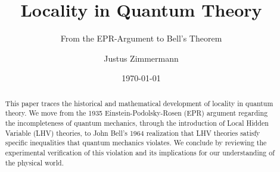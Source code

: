 \documentclass[a4paper, 12pt]{scrartcl}
\title{Locality in Quantum Theory}
\subtitle{From the EPR-Argument to Bell's Theorem}
\author{Justus Zimmermann}
\date{\today}
\begin{document}
\maketitle

\begin{abstract}
    This paper traces the historical and mathematical development of locality in quantum theory.
    We move from the 1935 Einstein-Podolsky-Rosen (EPR) argument regarding the incompleteness of quantum mechanics, through the introduction of Local Hidden Variable (LHV) theories, to John Bell's 1964 realization that LHV theories satisfy specific inequalities that quantum mechanics violates.
    We conclude by reviewing the experimental verification of this violation and its implications for our understanding of the physical world.
\end{abstract}















\printbibliography
\end{document}
